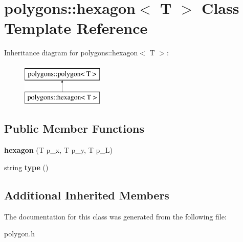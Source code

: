 \hypertarget{classpolygons_1_1hexagon}{\section{polygons\-:\-:hexagon$<$ T $>$ Class Template Reference}
\label{classpolygons_1_1hexagon}
}
Inheritance diagram for polygons\-:\-:hexagon$<$ T $>$\-:\begin{figure}[H]
\begin{center}
\leavevmode
\includegraphics[height=2.000000cm]{classpolygons_1_1hexagon}
\end{center}
\end{figure}
\subsection*{Public Member Functions}
\begin{DoxyCompactItemize}
\item 
\hypertarget{classpolygons_1_1hexagon_a3eca4db8c87b57820f0356943deadad4}{{\bfseries hexagon} (T p\-\_\-x, T p\-\_\-y, T p\-\_\-\-L)}\label{classpolygons_1_1hexagon_a3eca4db8c87b57820f0356943deadad4}

\item 
\hypertarget{classpolygons_1_1hexagon_a7e99cf11e5f1d3c0bfcd612ff238e4b6}{string {\bfseries type} ()}\label{classpolygons_1_1hexagon_a7e99cf11e5f1d3c0bfcd612ff238e4b6}

\end{DoxyCompactItemize}
\subsection*{Additional Inherited Members}


The documentation for this class was generated from the following file\-:\begin{DoxyCompactItemize}
\item 
polygon.\-h\end{DoxyCompactItemize}
